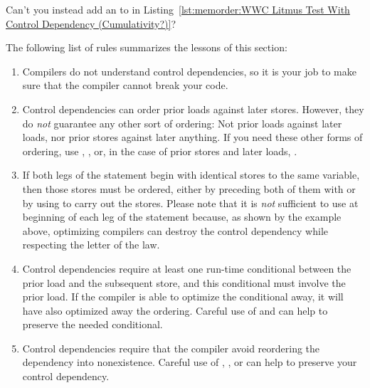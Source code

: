 \QuickQuiz{}
	Can't you instead add an  to  in
	Listing~\ref{lst:memorder:WWC Litmus Test With Control Dependency (Cumulativity?)}?
 \QuickQuizEnd

The following list of rules summarizes the lessons of this section:

\begin{enumerate}
\item	Compilers do not understand control dependencies, so it is
	your job to make sure that the compiler cannot break your code.

\item	Control dependencies can order prior loads against later stores.
	However, they do \emph{not} guarantee any other sort of ordering:
	Not prior loads against later loads, nor prior stores against
	later anything.
	If you need these other forms of ordering, use ,
	, or, in the case of prior stores and later loads,
	.

\item	If both legs of the  statement begin with identical stores
	to the same variable, then those stores must be ordered,
	either by preceding both of them with  or by using
	 to carry out the stores.
	Please note that it is \emph{not} sufficient to use 
	at beginning of each leg of the  statement because, as shown
	by the example above, optimizing compilers can destroy the control
	dependency while respecting the letter of the  law.

\item	Control dependencies require at least one run-time conditional
	between the prior load and the subsequent store, and this
	conditional must involve the prior load.
	If the compiler is able to optimize the conditional away, it
	will have also optimized away the ordering.
	Careful use of  and  can help
	to preserve the needed conditional.

\item	Control dependencies require that the compiler avoid reordering
	the dependency into nonexistence.
	Careful use of , , or
	 can help to preserve your control
	dependency.


\end{enumerate}
